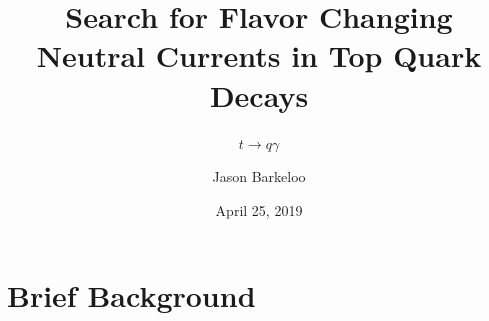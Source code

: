 \documentclass[10pt]{beamer}
\begin{document}
\title{Search for Flavor Changing Neutral Currents in Top Quark Decays}
\subtitle{$t \rightarrow q \gamma$}
\author[Barkeloo]{Jason Barkeloo}




\date{April 25, 2019}
\frame{\titlepage}
\section{Brief Background}
\end{document}

